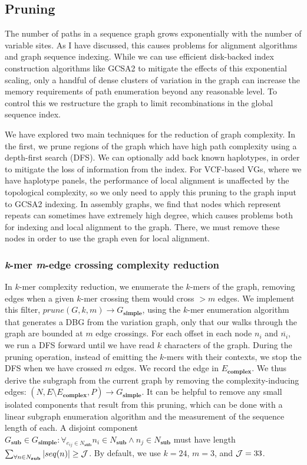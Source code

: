 \subsection{Pruning}

The number of paths in a sequence graph grows exponentially with the number of variable sites.
As I have discussed, this causes problems for alignment algorithms and graph sequence indexing.
While we can use efficient disk-backed index construction algorithms like GCSA2 to mitigate the effects of this exponential scaling, only a handful of dense clusters of variation in the graph can increase the memory requirements of path enumeration beyond any reasonable level.
To control this we restructure the graph to limit recombinations in the global sequence index.

We have explored two main techniques for the reduction of graph complexity.
In the first, we prune regions of the graph which have high path complexity using a depth-first search (DFS).
We can optionally add back known haplotypes, in order to mitigate the loss of information from the index.
For VCF-based VGs, where we have haplotype panels, the performance of local alignment is unaffected by the topological complexity, so we only need to apply this pruning to the graph input to GCSA2 indexing.
In assembly graphs, we find that nodes which represent repeats can sometimes have extremely high degree, which causes problems both for indexing and local alignment to the graph.
There, we must remove these nodes in order to use the graph even for local alignment.

\subsubsection{\emph{k}-mer \emph{m}-edge crossing complexity reduction}

In $k$-mer complexity reduction, we enumerate the $k$-mers of the graph, removing edges when a given $k$-mer crossing them would cross $> m$ edges.
We implement this filter, $prune(G, k, m) \to G_\textbf{simple}$, using the $k$-mer enumeration algorithm that generates a DBG from the variation graph, only that our walks through the graph are bounded at $m$ edge crossings.
For each offset in each node $n_i$ and $\overline{n_i}$, we run a DFS forward until we have read $k$ characters of the graph.
During the pruning operation, instead of emitting the $k$-mers with their contexts, we stop the DFS when we have crossed $m$ edges.
We record the edge in $E_\textbf{complex}$. %
We thus derive the subgraph from the current graph by removing the complexity-inducing edges: $(N, E \setminus E_\textbf{complex}, P) \to G_\textbf{simple}$.
It can be helpful to remove any small isolated components that result from this pruning, which can be done with a linear subgraph enumeration algorithm and the measurement of the sequence length of each.
A disjoint component $G_\textbf{sub} \in G_\textbf{simple} : \forall_{e_{ij} \in N_\textbf{sub}} n_i \in N_\textbf{sub} \land n_j \in N_\textbf{sub}$ must have length $\sum_{\forall n \in N_\textbf{sub}} |seq(n)| \geq {\cal J}$.
By default, we use $k=24$, $m=3$, and ${\cal J}=33$.

